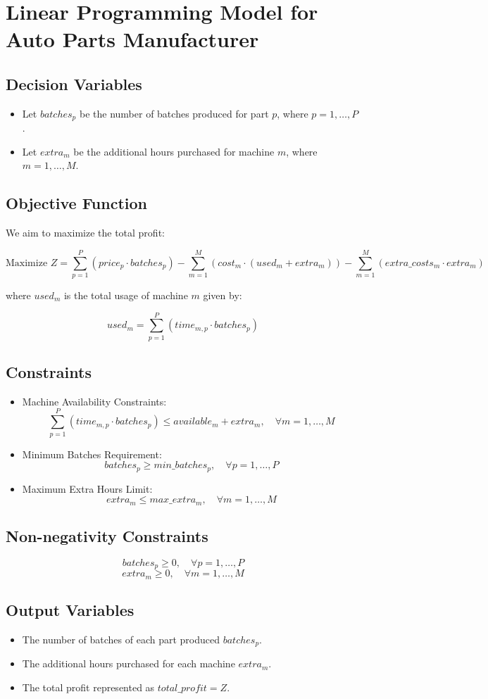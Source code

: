 \documentclass{article}
\begin{document}
\section*{Linear Programming Model for Auto Parts Manufacturer}

\subsection*{Decision Variables}
\begin{itemize}
    \item Let \(batches_{p}\) be the number of batches produced for part \(p\), where \(p = 1, \dots, P\).
    \item Let \(extra_{m}\) be the additional hours purchased for machine \(m\), where \(m = 1, \dots, M\).
\end{itemize}

\subsection*{Objective Function}
We aim to maximize the total profit:

\[
\text{Maximize } Z = \sum_{p=1}^{P} (price_{p} \cdot batches_{p}) - \sum_{m=1}^{M} (cost_{m} \cdot (used_{m} + extra_{m})) - \sum_{m=1}^{M} (extra\_costs_{m} \cdot extra_{m})
\]

where \(used_{m}\) is the total usage of machine \(m\) given by:

\[
used_{m} = \sum_{p=1}^{P} (time_{m,p} \cdot batches_{p})
\]

\subsection*{Constraints}

\begin{itemize}
    \item Machine Availability Constraints:
    \[
    \sum_{p=1}^{P} (time_{m,p} \cdot batches_{p}) \leq available_{m} + extra_{m}, \quad \forall m = 1, \ldots, M
    \]

    \item Minimum Batches Requirement:
    \[
    batches_{p} \geq min\_batches_{p}, \quad \forall p = 1, \ldots, P
    \]

    \item Maximum Extra Hours Limit:
    \[
    extra_{m} \leq max\_extra_{m}, \quad \forall m = 1, \ldots, M
    \]
\end{itemize}

\subsection*{Non-negativity Constraints}
\[
batches_{p} \geq 0, \quad \forall p = 1, \ldots, P
\]
\[
extra_{m} \geq 0, \quad \forall m = 1, \ldots, M
\]

\subsection*{Output Variables}
\begin{itemize}
    \item The number of batches of each part produced \(batches_{p}\).
    \item The additional hours purchased for each machine \(extra_{m}\).
    \item The total profit represented as \(total\_profit = Z\).
\end{itemize}
\end{document}
